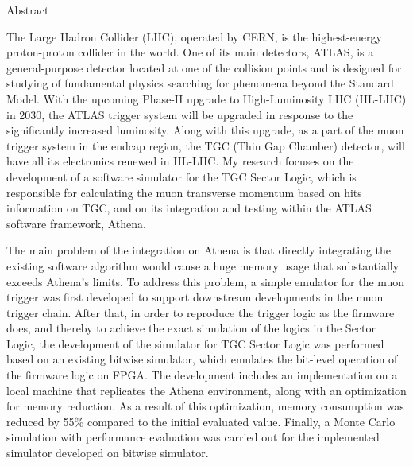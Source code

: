 \begin{abstractpage}{Abstract}



    The Large Hadron Collider (LHC), operated by CERN, is the highest-energy proton-proton collider in the world. One of its main detectors, ATLAS, is a general-purpose detector located at one of the collision points and is designed for studying of fundamental physics searching for phenomena beyond the Standard Model. With the upcoming Phase-II upgrade to High-Luminosity LHC (HL-LHC) in 2030, the ATLAS trigger system will be upgraded in response to the significantly increased luminosity. Along with this upgrade, as a part of the muon trigger system in the endcap region, the TGC (Thin Gap Chamber) detector, will have all its electronics renewed in HL-LHC. My research focuses on the development of a software simulator for the TGC Sector Logic, which is responsible for calculating the muon transverse momentum based on hits information on TGC, and on its integration and testing within the ATLAS software framework, Athena.

    The main problem of the integration on Athena is that directly integrating the existing software algorithm would cause a huge memory usage that substantially exceeds Athena’s limits. To address this problem, a simple emulator for the muon trigger was first developed to support downstream developments in the muon trigger chain. After that, in order to reproduce the trigger logic as the firmware does, and thereby to achieve the exact simulation of the logics in the Sector Logic, the development of the simulator for TGC Sector Logic was performed based on an existing bitwise simulator, which emulates the bit-level operation of the firmware logic on FPGA. The development includes an implementation on a local machine that replicates the Athena environment, along with an optimization for memory reduction. As a result of this optimization, memory consumption was reduced by 55\% compared to the initial evaluated value. Finally, a Monte Carlo simulation with performance evaluation was carried out for the implemented simulator developed on bitwise simulator.

\end{abstractpage}
